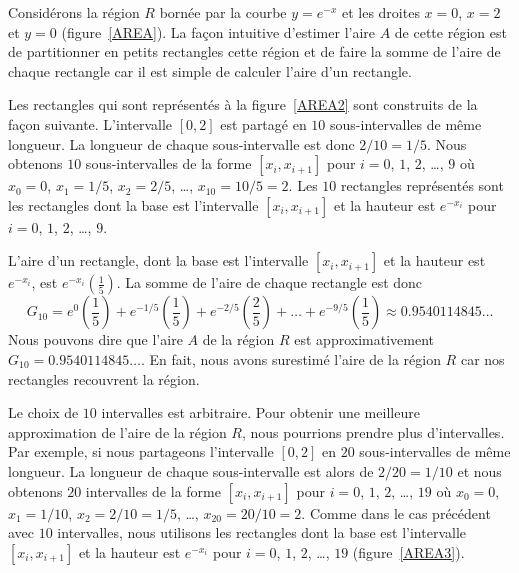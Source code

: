 {Considérons la région $R$ bornée par la courbe $y=e^{-x}$ et les
droites $x=0$, $x=2$ et $y=0$ (figure~\ref{AREA}).  La façon 
intuitive d'estimer l'aire $A$ de cette région est de partitionner en
petits rectangles cette région et de faire la somme de l'aire de
chaque rectangle car il est simple de calculer l'aire d'un rectangle.


Les rectangles qui sont représentés à la figure~\ref{AREA2} sont
construits de la façon suivante.  L'intervalle $[0,2]$ est partagé en
$10$ sous-intervalles de même longueur.  La longueur de chaque 
sous-intervalle est donc $2/10 = 1/5$.  Nous obtenons $10$
sous-intervalles de la forme $[x_i,x_{i+1}]$ pour $i=0$, $1$, $2$,
\ldots, $9$ où $x_0 = 0$, $x_1 = 1/5$, $x_2 = 2/5$, \ldots ,
$x_{10} = 10/5 = 2$.   Les $10$ rectangles représentés sont les
rectangles dont la base est l'intervalle $[x_i, x_{i+1}]$ et la
hauteur est $e^{-x_i}$ pour $i=0$, $1$, $2$, \ldots, $9$.


L'aire d'un rectangle, dont la base est l'intervalle $[x_i, x_{i+1}]$
et la hauteur est $e^{-x_i}$, est $e^{-x_i} \left(\frac{1}{5}\right)$.
La somme de l'aire de chaque rectangle est donc
\[
G_{10} = e^{0} \left(\frac{1}{5}\right)
+ e^{-1/5} \left(\frac{1}{5}\right)
+ e^{-2/5} \left(\frac{2}{5}\right)
+ \ldots + e^{-9/5} \left(\frac{1}{5}\right) \approx
0.9540114845\ldots
\]
Nous pouvons dire que l'aire $A$ de la région $R$ est approximativement
$G_{10} = 0.9540114845\ldots$.  En fait, nous avons surestimé l'aire de la
région $R$ car nos rectangles recouvrent la région.

Le choix de $10$ intervalles est arbitraire.  Pour obtenir une
meilleure approximation de l'aire de la région $R$, nous pourrions
prendre plus d'intervalles.  Par exemple, si nous partageons l'intervalle
$[0,2]$ en $20$ sous-intervalles de même longueur.  La longueur de
chaque sous-intervalle est alors de $2/20 = 1/10$ et nous obtenons $20$
intervalles de la forme $[x_i,x_{i+1}]$ pour $i=0$, $1$, $2$, \ldots,
$19$ où $x_0 = 0$, $x_1 = 1/10$, $x_2 = 2/10 = 1/5$, \ldots,
$x_{20} = 20/10 = 2$. Comme dans le cas précédent avec $10$
intervalles, nous utilisons les rectangles dont la base est l'intervalle
$[x_i, x_{i+1}]$ et la hauteur est $e^{-x_i}$ pour $i=0$, $1$, $2$,
\ldots, $19$ (figure~\ref{AREA3}).

}
